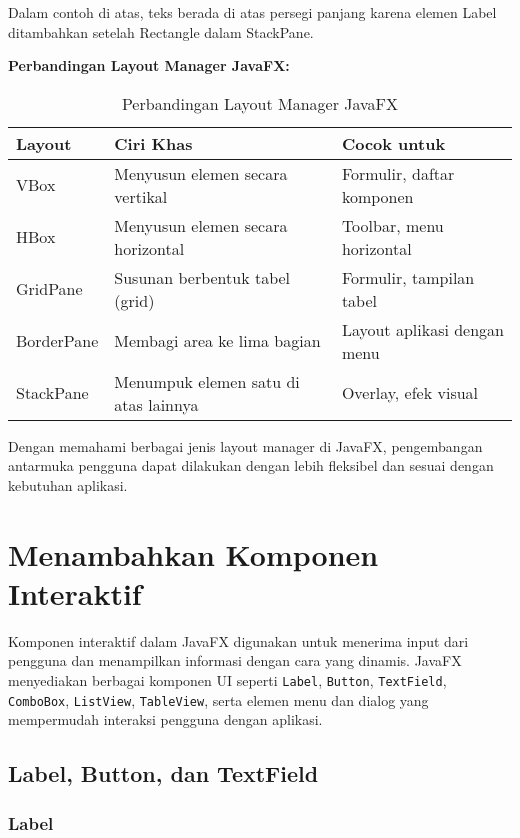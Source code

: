 Dalam contoh di atas, teks berada di atas persegi panjang karena elemen Label ditambahkan setelah Rectangle dalam StackPane.

\textbf{Perbandingan Layout Manager JavaFX:}

\begin{table}[h]
\centering
\begin{tabular}{|l|l|l|}
	\hline
	\textbf{Layout} & \textbf{Ciri Khas} & \textbf{Cocok untuk} \\
	\hline
	VBox & Menyusun elemen secara vertikal & Formulir, daftar komponen \\
	HBox & Menyusun elemen secara horizontal & Toolbar, menu horizontal \\
	GridPane & Susunan berbentuk tabel (grid) & Formulir, tampilan tabel \\
	BorderPane & Membagi area ke lima bagian & Layout aplikasi dengan menu \\
	StackPane & Menumpuk elemen satu di atas lainnya & Overlay, efek visual \\
	\hline
\end{tabular}
\caption{Perbandingan Layout Manager JavaFX}
\end{table}

Dengan memahami berbagai jenis layout manager di JavaFX, pengembangan antarmuka pengguna dapat dilakukan dengan lebih fleksibel dan sesuai dengan kebutuhan aplikasi.


\section{Menambahkan Komponen Interaktif}

Komponen interaktif dalam JavaFX digunakan untuk menerima input dari pengguna dan menampilkan informasi dengan cara yang dinamis. JavaFX menyediakan berbagai komponen UI seperti \texttt{Label}, \texttt{Button}, \texttt{TextField}, \texttt{ComboBox}, \texttt{ListView}, \texttt{TableView}, serta elemen menu dan dialog yang mempermudah interaksi pengguna dengan aplikasi.

\subsection{Label, Button, dan TextField}

\subsubsection{Label}


